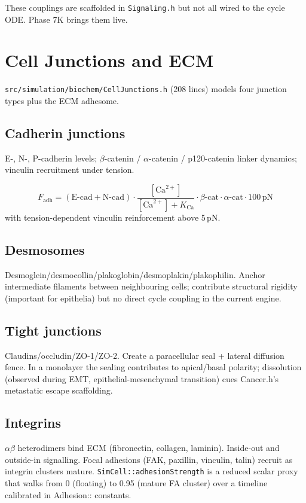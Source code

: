 \documentclass[11pt,letterpaper,twoside,openany]{book}
\newcommand{\code}[1]{\texttt{#1}}
\newcommand{\file}[1]{\texttt{\small#1}}
\begin{document}
These couplings are scaffolded in \file{Signaling.h} but not all
wired to the cycle ODE. Phase 7K brings them live.

\chapter{Cell Junctions and ECM}
\label{ch:junctions}

\file{src/simulation/biochem/CellJunctions.h} (208 lines) models
four junction types plus the ECM adhesome.

\section{Cadherin junctions}

E-, N-, P-cadherin levels; $\beta$-catenin / $\alpha$-catenin /
p120-catenin linker dynamics; vinculin recruitment under tension.

\begin{equation}
  F_{\text{adh}} = (\text{E-cad} + \text{N-cad})\cdot\frac{[\text{Ca}^{2+}]}{[\text{Ca}^{2+}]+K_{\text{Ca}}}\cdot\beta\text{-cat}\cdot\alpha\text{-cat}\cdot 100\,\text{pN}
\end{equation}
with tension-dependent vinculin reinforcement above 5\,pN.

\section{Desmosomes}

Desmoglein/desmocollin/plakoglobin/desmoplakin/plakophilin. Anchor
intermediate filaments between neighbouring cells; contribute
structural rigidity (important for epithelia) but no direct cycle
coupling in the current engine.

\section{Tight junctions}

Claudins/occludin/ZO-1/ZO-2. Create a paracellular seal + lateral
diffusion fence. In a monolayer the sealing contributes to
apical/basal polarity; dissolution (observed during EMT,
epithelial-mesenchymal transition) cues Cancer.h's metastatic
escape scaffolding.

\section{Integrins}

$\alpha\beta$ heterodimers bind ECM (fibronectin, collagen,
laminin). Inside-out and outside-in signalling. Focal adhesions
(FAK, paxillin, vinculin, talin) recruit as integrin clusters
mature. \code{SimCell::adhesionStrength} is a reduced scalar
proxy that walks from 0 (floating) to 0.95 (mature FA cluster)
over a timeline calibrated in Adhesion:: constants.
\end{document}
